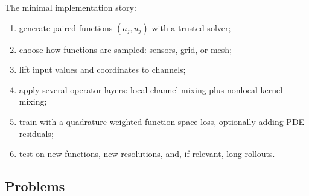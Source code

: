 \documentclass[10pt,a4paper]{article}
\begin{document}
\medskip
The minimal implementation story:
\begin{enumerate}
\item generate paired functions $(a_j,u_j)$ with a trusted solver;
\item choose how functions are sampled: sensors, grid, or mesh;
\item lift input values and coordinates to channels;
\item apply several operator layers: local channel mixing plus nonlocal kernel
mixing;
\item train with a quadrature-weighted function-space loss, optionally adding
PDE residuals;
\item test on new functions, new resolutions, and, if relevant, long rollouts.
\end{enumerate}

\subsection*{Problems}
\end{document}
